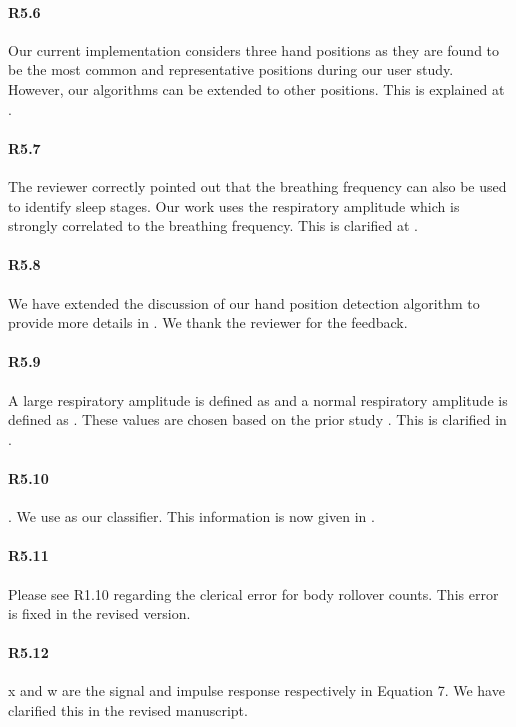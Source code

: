 \paragraph{R5.6} Our current implementation considers three hand positions as they are found to be the most common and representative
positions during our user study. However, our algorithms can be extended to other positions. This is explained at .

\paragraph{R5.7} The reviewer correctly pointed out that the breathing frequency can also be used to identify sleep stages. Our work uses
the respiratory amplitude which is strongly correlated to the breathing frequency. This is clarified at .

\paragraph{R5.8} We have extended the discussion of our hand position detection algorithm to provide more details in . We
thank the reviewer for the feedback.

\paragraph{R5.9} A large respiratory amplitude is defined as  and a normal respiratory amplitude is defined as
. These values are chosen based on the prior study . This is clarified in
.

\paragraph{R5.10} . We use  as our classifier. This information is now given in .

\paragraph{R5.11} Please see R1.10 regarding the clerical error for body rollover counts. This error is fixed in the revised version.

\paragraph{R5.12} x and w are the signal and impulse response respectively in Equation 7. We have clarified this in the revised manuscript.

